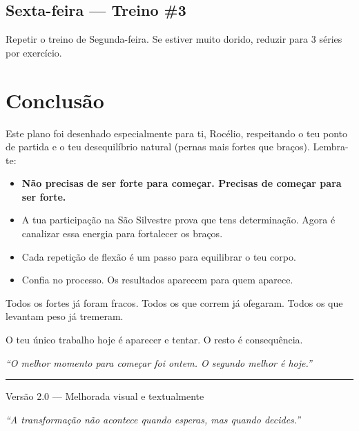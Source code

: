 \documentclass[12pt,a4paper]{scrartcl}
\begin{document}
\subsection{Sexta-feira — Treino \#3}
Repetir o treino de Segunda-feira. Se estiver muito dorido, reduzir para 3 séries por exercício.

\section*{Conclusão}
Este plano foi desenhado especialmente para ti, Rocélio, respeitando o teu ponto de partida e o teu desequilíbrio natural (pernas mais fortes que braços). Lembra-te:

\begin{itemize}
    \item \textbf{Não precisas de ser forte para começar. Precisas de começar para ser forte.}
    \item A tua participação na São Silvestre prova que tens determinação. Agora é canalizar essa energia para fortalecer os braços.
    \item Cada repetição de flexão é um passo para equilibrar o teu corpo.
    \item Confia no processo. Os resultados aparecem para quem aparece.
\end{itemize}

Todos os fortes já foram fracos. Todos os que correm já ofegaram. Todos os que levantam peso já tremeram.

O teu único trabalho hoje é aparecer e tentar. O resto é consequência.

\begin{center}
\textit{“O melhor momento para começar foi ontem. O segundo melhor é hoje.”}
\end{center}

\vspace{2cm}
\begin{center}
\rule{0.7\textwidth}{0.5pt}
\small\textcolor{primary}{Versão 2.0 — Melhorada visual e textualmente}
\end{center}

\newpage
\thispagestyle{empty}
\vspace*{\fill}
\begin{center}
\textit{“A transformação não acontece quando esperas, mas quando decides.”}
\end{center}
\vspace*{\fill}
\end{document}
